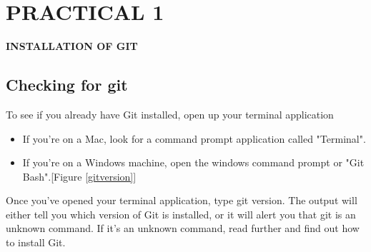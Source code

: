 \documentclass[12pt]{article}
\begin{document}
\clearpage
\tableofcontents
\thispagestyle{empty}
\clearpage


\section{PRACTICAL 1}
\setcounter{page}{1}
{\bfseries INSTALLATION OF GIT}
\subsection{Checking for git}
To see if you already have Git installed, open up your terminal application
\begin{itemize}
\item If you're on a Mac, look for a command prompt application called "Terminal".
\item If you're on a Windows machine, open the windows command prompt or "Git Bash".[Figure \ref{gitversion}]
\end{itemize}

\noindent
Once you've opened your terminal application, type git version. The output will either tell you which version of Git is installed, or it will alert you that git is an unknown command. If it's an unknown command, read further and find out how to install Git.
\end{document}
